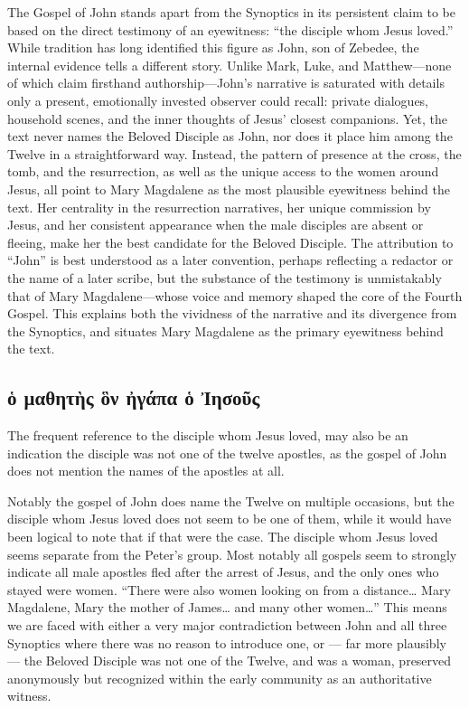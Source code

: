 The Gospel of John stands apart from the Synoptics in its persistent claim to be based on the direct testimony of an eyewitness: “the disciple whom Jesus loved.” While tradition has long identified this figure as John, son of Zebedee, the internal evidence tells a different story. Unlike Mark, Luke, and Matthew—none of which claim firsthand authorship—John’s narrative is saturated with details only a present, emotionally invested observer could recall: private dialogues, household scenes, and the inner thoughts of Jesus’ closest companions. Yet, the text never names the Beloved Disciple as John, nor does it place him among the Twelve in a straightforward way. Instead, the pattern of presence at the cross, the tomb, and the resurrection, as well as the unique access to the women around Jesus, all point to Mary Magdalene as the most plausible eyewitness behind the text. Her centrality in the resurrection narratives, her unique commission by Jesus, and her consistent appearance when the male disciples are absent or fleeing, make her the best candidate for the Beloved Disciple. The attribution to “John” is best understood as a later convention, perhaps reflecting a redactor or the name of a later scribe, but the substance of the testimony is unmistakably that of Mary Magdalene—whose voice and memory shaped the core of the Fourth Gospel. This explains both the vividness of the narrative and its divergence from the Synoptics, and situates Mary Magdalene as the primary eyewitness behind the text.

\subsection{ὁ μαθητὴς ὃν ἠγάπα ὁ Ἰησοῦς}\label{subsec:ux1f41-ux3bcux3b1ux3b8ux3b7ux3c4ux1f74ux3c2-ux1f43ux3bd-ux1f20ux3b3ux3acux3c0ux3b1-ux1f41-ux1f30ux3b7ux3c3ux3bfux1fe6ux3c2}

The frequent reference to the disciple whom Jesus loved, may also be an indication the disciple was not one of the twelve apostles, as the gospel of John does not mention the names of the apostles at all.

Notably the gospel of John does name the Twelve on multiple occasions, but the disciple whom Jesus loved does not seem to be one of them, while it would have been logical to note that if that were the case.
The disciple whom Jesus loved seems separate from the Peter's group.
Most notably all gospels seem to strongly indicate all male apostles fled after the arrest of Jesus, and the only ones who stayed were women.
``There were also women looking on from a distance\ldots{} Mary Magdalene, Mary the mother of James\ldots{} and many other women\ldots'' This means we are faced with either a very major contradiction between John and all three Synoptics where there was no reason to introduce one, or --- far more plausibly --- the Beloved Disciple was not one of the Twelve, and was a woman, preserved anonymously but recognized within the early community as an authoritative witness.

